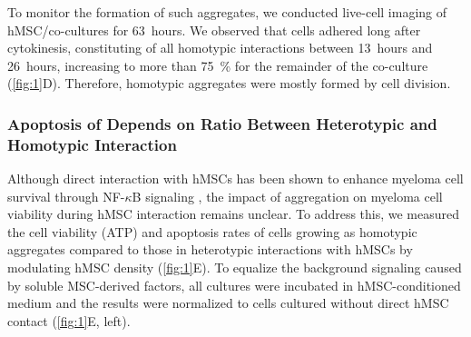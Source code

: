 To monitor the formation of such aggregates, we conducted live-cell imaging of
hMSC/\INA co-cultures for \SI{63}{hours}. We observed that \INA cells adhered
long after cytokinesis, constituting  of all
homotypic interactions between \SI{13}{hours} and \SI{26}{hours}, increasing to
more than \SI{75}{\percent} for the remainder of the co-culture
(\autoref{fig:1}D). Therefore, homotypic \INA aggregates were mostly formed by
cell division.

\subsubsection*{Apoptosis of \INA Depends on Ratio Between Heterotypic and Homotypic Interaction}
Although direct interaction with hMSCs has been shown to enhance myeloma cell
survival through NF-$\kappa$B signaling
\cite{hideshimaUnderstandingMultipleMyeloma2007}, the impact of aggregation on
myeloma cell viability during hMSC interaction remains unclear. To address this,
we measured the cell viability (ATP) and apoptosis rates of \INA cells growing
as homotypic aggregates compared to those in heterotypic interactions with hMSCs
by modulating hMSC density (\autoref{fig:1}E). To equalize the background
signaling caused by soluble MSC-derived factors, all cultures were incubated in
hMSC-conditioned medium and the results were normalized to \INA cells cultured
without direct hMSC contact (\autoref{fig:1}E, left).

\newpage


